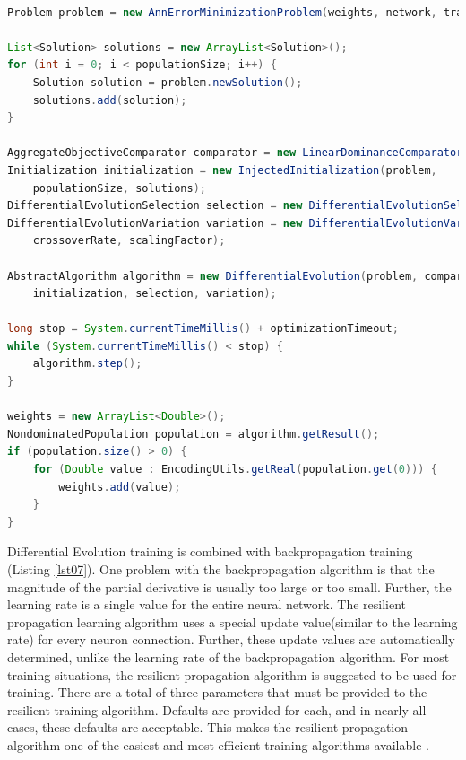 \documentclass[a4paper,conference]{IEEEtran}
\begin{document}
\begin{lstlisting}[caption=Differential Evolution training, language=Java, basicstyle=\tiny, label=lst02]

Problem problem = new AnnErrorMinimizationProblem(weights, network, train);

List<Solution> solutions = new ArrayList<Solution>();
for (int i = 0; i < populationSize; i++) {
    Solution solution = problem.newSolution();
    solutions.add(solution);
}

AggregateObjectiveComparator comparator = new LinearDominanceComparator();
Initialization initialization = new InjectedInitialization(problem, 
    populationSize, solutions);
DifferentialEvolutionSelection selection = new DifferentialEvolutionSelection();
DifferentialEvolutionVariation variation = new DifferentialEvolutionVariation(
    crossoverRate, scalingFactor);

AbstractAlgorithm algorithm = new DifferentialEvolution(problem, comparator, 
    initialization, selection, variation);

long stop = System.currentTimeMillis() + optimizationTimeout;
while (System.currentTimeMillis() < stop) {
    algorithm.step();
}

weights = new ArrayList<Double>();
NondominatedPopulation population = algorithm.getResult();
if (population.size() > 0) {
    for (Double value : EncodingUtils.getReal(population.get(0))) {
        weights.add(value);
    }
}

\end{lstlisting}

Differential Evolution training is combined with backpropagation training (Listing \ref{lst07}). One problem with the backpropagation algorithm is that the magnitude of the partial derivative is usually too large or too small. Further, the learning rate is a single value for the entire neural network. The resilient propagation learning algorithm uses a special update value(similar to the learning rate) for every neuron connection. Further, these update values are automatically determined, unlike the learning rate of the backpropagation algorithm. For most training situations, the resilient propagation algorithm is suggested to be used for training. There are a total of three parameters that must be provided to the resilient training algorithm. Defaults are provided for each, and in nearly all cases, these defaults are acceptable. This makes the resilient propagation algorithm one of the easiest and most efficient training algorithms available \cite{Heaton-01}.
\end{document}
